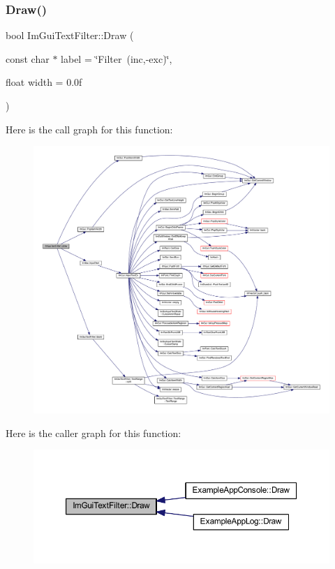\subsubsection{\texorpdfstring{Draw()}{Draw()}}
{\footnotesize\ttfamily bool Im\+Gui\+Text\+Filter\+::\+Draw (\begin{DoxyParamCaption}\item[{const char $\ast$}]{label = {\ttfamily \char`\"{}Filter~(inc,-\/exc)\char`\"{}},  }\item[{float}]{width = {\ttfamily 0.0f} }\end{DoxyParamCaption})}

Here is the call graph for this function\+:
\nopagebreak
\begin{figure}[H]
\begin{center}
\leavevmode
\includegraphics[width=350pt]{struct_im_gui_text_filter_ab93ad5985019ff9d3781606551fc26cc_cgraph}
\end{center}
\end{figure}
Here is the caller graph for this function\+:
\nopagebreak
\begin{figure}[H]
\begin{center}
\leavevmode
\includegraphics[width=350pt]{struct_im_gui_text_filter_ab93ad5985019ff9d3781606551fc26cc_icgraph}
\end{center}
\end{figure}
\mbox{\label{struct_im_gui_text_filter_a493158f2ab8f45fcf303c3f953be9b88}} 
